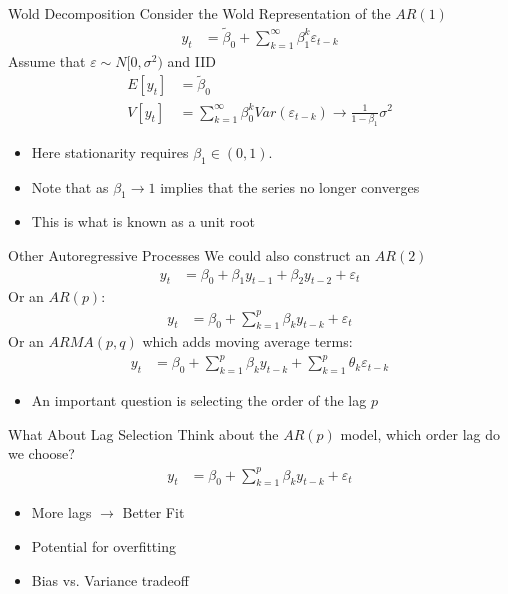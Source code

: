 \documentclass[aspectratio=169]{beamer}
\begin{document}
\begin{frame}{Wold Decomposition}
Consider the Wold Representation of the $AR(1)$
\begin{align*}
y_t &= \widetilde{\beta}_0 + \sum_{k=1}^{\infty} \beta_1^{k} \varepsilon_{t-k}
\end{align*}
Assume that $\varepsilon \sim N[0,\sigma^2)$ and IID
\begin{align*}
E[y_t] &= \widetilde{\beta}_0 \\
V[y_t] &= \sum_{k=1}^{\infty} \beta_0^{k} Var(\varepsilon_{t-k})  \rightarrow \frac{1}{1-\beta_1} \sigma^2 
\end{align*}
\begin{itemize}
    \item Here \alert{stationarity} requires $\beta_1 \in (0,1)$.
    \item Note that as $\beta_1 \rightarrow 1$ implies that the series no longer converges
    \item This is what is known as a \alert{unit root}
\end{itemize}
\end{frame}

\begin{frame}{Other Autoregressive Processes}
We could also construct an $AR(2)$
\begin{align*}
y_t &= \beta_0 + \beta_1 y_{t-1} + \beta_2 y_{t-2} + \varepsilon_{t}
\end{align*}
Or an $AR(p)$:
\begin{align*}
y_t &= \beta_0 + \sum_{k=1}^p \beta_k y_{t-k} + \varepsilon_{t}
\end{align*}
Or an $ARMA(p,q)$ which adds moving average terms:
\begin{align*}
y_t &= \beta_0 + \sum_{k=1}^p \beta_k y_{t-k} + \sum_{k=1}^p \theta_k \varepsilon_{t-k} 
\end{align*}
\begin{itemize}
\item An important question is \alert{selecting the order of the lag} $p$
\end{itemize}
\end{frame}


\begin{frame}{What About Lag Selection}
Think about the $AR(p)$ model, which order lag do we choose?
\begin{align*}
y_t &= \beta_0 + \sum_{k=1}^p \beta_k y_{t-k} + \varepsilon_{t}
\end{align*}
\begin{itemize}
  \item More lags $\rightarrow$ Better Fit
  \item Potential for \alert{overfitting}
  \item Bias vs. Variance tradeoff
\end{itemize}
\end{frame}
\end{document}

